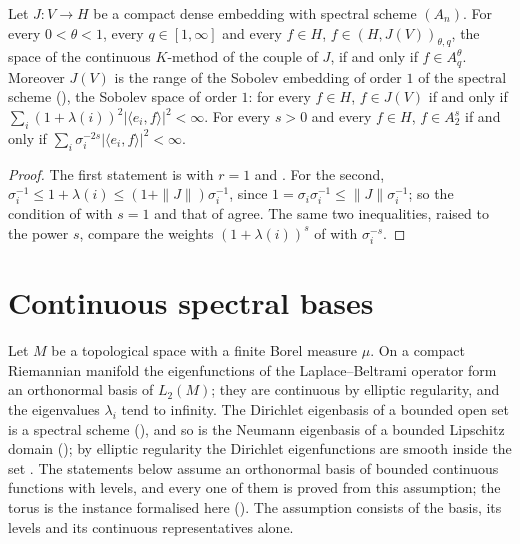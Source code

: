 \begin{corollary}
\label{cor:compact-embedding-interpolation}
\leanok
{}
Let $J : V \to H$ be a compact dense embedding with spectral scheme $(A_n)$. For every
$0 < \theta < 1$, every $q \in [1, \infty]$ and every $f \in H$, $f \in (H, J(V))_{\theta, q}$,
the space of the continuous $K$-method of the couple of $J$, if and only if $f \in A^\theta_q$.
Moreover $J(V)$ is the range of the Sobolev embedding of order $1$ of the spectral scheme
(), the Sobolev space of order $1$: for every $f \in H$, $f \in J(V)$ if
and only if
$\sum_i (1 + \lambda(i))^2 |\langle e_i, f \rangle|^2 < \infty$. For every $s > 0$ and every
$f \in H$, $f \in A^s_2$ if and only if
$\sum_i \sigma_i^{-2s} |\langle e_i, f \rangle|^2 < \infty$.
\end{corollary}

\begin{proof}
\leanok
The first statement is  with $r = 1$ and
. For the second,
$\sigma_i^{-1} \leq 1 + \lambda(i) \leq (1 + \|J\|) \sigma_i^{-1}$, since
$1 = \sigma_i \sigma_i^{-1} \leq \|J\| \sigma_i^{-1}$; so the condition of
 with $s = 1$ and that of  agree.
The same two inequalities, raised to the power $s$, compare the weights $(1 + \lambda(i))^s$ of
 with $\sigma_i^{-s}$.
\end{proof}

\section{Continuous spectral bases}
\label{sec:continuous-spectral-bases}

Let $M$ be a topological space with a finite Borel measure $\mu$. On a compact Riemannian
manifold the eigenfunctions of the Laplace--Beltrami operator form an orthonormal basis of
$L_2(M)$; they are continuous by elliptic regularity, and the eigenvalues $\lambda_i$ tend to
infinity. The Dirichlet eigenbasis of a bounded open set is a spectral scheme
(), and so is the Neumann eigenbasis of a bounded Lipschitz domain
(); by elliptic regularity the Dirichlet eigenfunctions are smooth
inside the set \cite[Theorem~9.31, p.~311]{Brezis2011}. The statements below assume an
orthonormal basis of bounded continuous functions with levels, and every one of them is proved
from this assumption; the torus is the instance formalised here
(). The assumption
consists of the basis, its levels and its continuous representatives alone.

